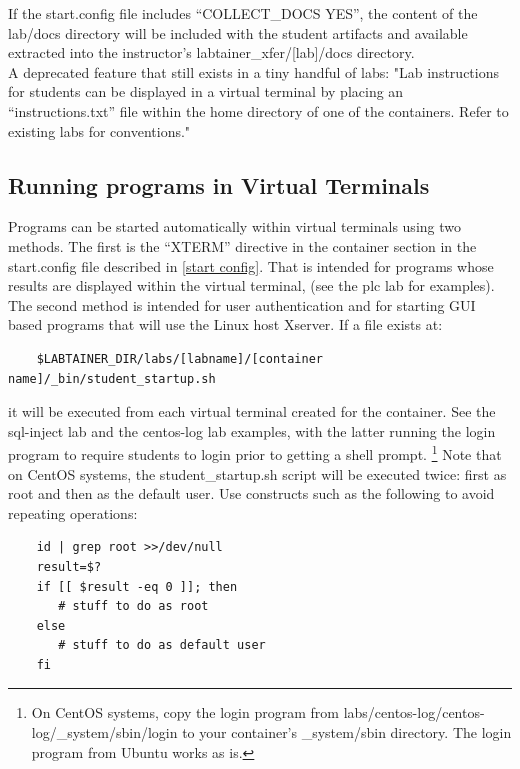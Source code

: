 \documentclass[12pt]{article}
\begin{document}
\noindent If the start.config file includes ``COLLECT\_DOCS YES'', the content of the lab/docs directory will be
included with the student artifacts and available extracted into the instructor's 
labtainer\_xfer/[lab]/docs directory. \\

\noindent A deprecated feature that still exists in a tiny handful of labs: "Lab instructions for students can be displayed in a virtual terminal by placing an
``instructions.txt'' file within the home directory of one of the containers.  Refer to existing
labs for conventions."  


\subsection {Running programs in Virtual Terminals}
\label {student start}
Programs can be started automatically within virtual terminals using two methods.
The first is the ``XTERM'' directive in the container section in the start.config file
described in \ref{start config}.  That is intended for programs whose results are displayed
within the virtual terminal, (see the plc lab for examples).  The second method is 
intended for user authentication and for starting GUI based programs
that will use the Linux host Xserver.  If a file exists at:
\begin{verbatim}
    $LABTAINER_DIR/labs/[labname]/[container name]/_bin/student_startup.sh
\end{verbatim}
it will be executed from each virtual terminal created for the container.
See the sql-inject lab and the centos-log lab examples, with the latter
running the login program to require students to login prior to getting a shell prompt.
\footnote{On CentOS systems, copy the login program from labs/centos-log/centos-log/\_system/sbin/login
to your container's \_system/sbin directory. The login program from Ubuntu works as is.}
Note that on CentOS systems, the student\_startup.sh script will be executed twice: first
as root and then as the default user.  Use constructs such as the following to avoid repeating
operations:
\begin{verbatim}
    id | grep root >>/dev/null
    result=$?
    if [[ $result -eq 0 ]]; then
       # stuff to do as root
    else
       # stuff to do as default user
    fi
\end{verbatim}
\end{document}
